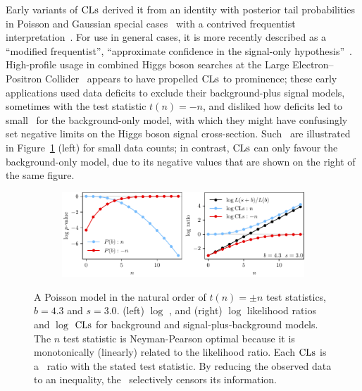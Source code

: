 Early variants of $\mathrm{CLs}$ derived it from an identity with posterior tail
probabilities in Poisson and Gaussian special cases~\cite{
Helene1983upper,
pdg1988,
read2000modified,
pdg2022ynf
}
with a contrived frequentist interpretation~\cite{zech1988cls}.
For use in general cases, it is more recently described as a
``modified frequentist'',
``approximate confidence in the signal-only hypothesis''~\cite{
read2000modified,
Read2002cls
}.
High-profile usage in combined Higgs boson searches at the
Large Electron–Positron Collider~\cite{
read1997optimal,
bock1998lower,
etde1998prospects,
junk1999confidence,
lep2000searches,
lep2003search
}
appears to have propelled $\mathrm{CLs}$ to prominence;
these early applications used data deficits to exclude their
background-plus signal models, sometimes with the test statistic $t(n) = -n$,
and disliked how deficits led to small \pvalues\ for the background-only model,
with which they might have confusingly set negative limits on the Higgs boson
signal cross-section.
Such \pvalues\ are illustrated in Figure~\ref{fig:searches_sb_n} (left)
for small data counts;
in contrast, $\mathrm{CLs}$ can only favour the background-only model, due to its
negative values that are shown on the right of the same figure.

\begin{figure}[tp]
\centering
\begin{subfigure}{\textwidth}
\centering
\includegraphics[width=\textwidth]{figures/searches_cls_plots_with_pvals_n.pdf}
\end{subfigure}
\caption[
A Poisson model in the natural order
]{%
A Poisson model in the natural order of $t(n) = \pm n$
test statistics, $b = 4.3$ and $s = 3.0$.
(left) $\log$ \pvalues,
and (right) $\log$ likelihood ratios and $\log$ $\mathrm{CLs}$ for
background and signal-plus-background models.
The $n$ test statistic is Neyman-Pearson optimal because it is monotonically
(linearly) related to the likelihood ratio.
Each $\mathrm{CLs}$ is a \pvalue\ ratio with the stated test statistic.
By reducing the observed data to an inequality, the \pvalue\ selectively
censors its information.
}
\label{fig:searches_sb_n}
\end{figure}

